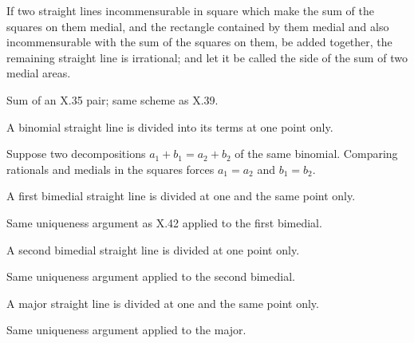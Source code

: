 \begin{claim}
\label{prop:X.41}
If two straight lines incommensurable in square which make the sum
of the squares on them medial, and the rectangle contained by them
medial and also incommensurable with the sum of the squares on them,
be added together, the remaining straight line is irrational; and
let it be called the side of the sum of two medial areas.
\end{claim}
\begin{evidence}[Proof of X.41]
\label{ev:X.41}
Sum of an X.35 pair; same scheme as X.39.
\end{evidence}

\begin{claim}
\label{prop:X.42}
A binomial straight line is divided into its terms at one point only.
\end{claim}
\begin{evidence}[Proof of X.42]
\label{ev:X.42}
Suppose two decompositions $a_1 + b_1 = a_2 + b_2$ of the same
binomial.  Comparing rationals and medials in the squares forces
$a_1 = a_2$ and $b_1 = b_2$.
\end{evidence}

\begin{claim}
\label{prop:X.43}
A first bimedial straight line is divided at one and the same point
only.
\end{claim}
\begin{evidence}[Proof of X.43]
\label{ev:X.43}
Same uniqueness argument as X.42 applied to the first bimedial.
\end{evidence}

\begin{claim}
\label{prop:X.44}
A second bimedial straight line is divided at one point only.
\end{claim}
\begin{evidence}[Proof of X.44]
\label{ev:X.44}
Same uniqueness argument applied to the second bimedial.
\end{evidence}

\begin{claim}
\label{prop:X.45}
A major straight line is divided at one and the same point only.
\end{claim}
\begin{evidence}[Proof of X.45]
\label{ev:X.45}
Same uniqueness argument applied to the major.
\end{evidence}


